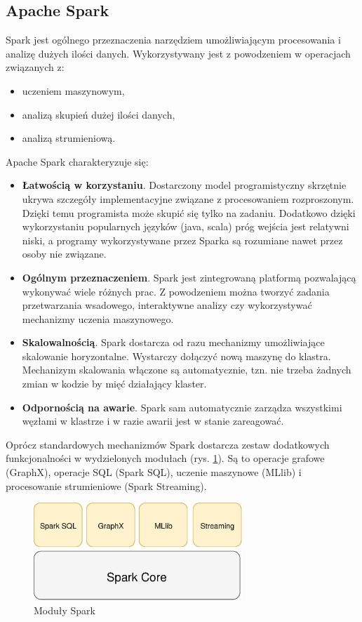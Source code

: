 \subsection{Apache Spark}
Spark jest ogólnego przeznaczenia narzędziem umożliwiającym procesowania
i analizę dużych ilości danych.
Wykorzystywany jest z powodzeniem w operacjach związanych z:
\begin{itemize}
  \item uczeniem maszynowym,
  \item analizą skupień dużej ilości danych,
  \item analizą strumieniową.
\end{itemize}
Apache Spark charakteryzuje się:
\begin{itemize}
  \item \textbf{Łatwością w korzystaniu}.
  Dostarczony model programistyczny skrzętnie ukrywa szczegóły implementacyjne związane z procesowaniem rozproszonym.
  Dzięki temu programista może skupić się tylko na zadaniu.
  Dodatkowo dzięki wykorzystaniu popularnych języków (java, scala) próg wejścia jest relatywni niski,
  a programy wykorzystywane przez Sparka są rozumiane nawet przez osoby nie związane.
  \item \textbf{Ogólnym przeznaczeniem}.
  Spark jest zintegrowaną platformą pozwalającą wykonywać wiele różnych prac.
  Z powodzeniem można tworzyć zadania przetwarzania wsadowego,
  interaktywne analizy czy wykorzystywać mechanizmy uczenia maszynowego.
  \item \textbf{Skalowalnością}.
  Spark dostarcza od razu mechanizmy umożliwiające skalowanie horyzontalne.
  Wystarczy dołączyć nową maszynę do klastra.
  Mechanizym skalowania włączone są automatycznie,
  tzn. nie trzeba żadnych zmian w kodzie by mięć działający klaster.
  \item \textbf{Odpornością na awarie}.
  Spark sam automatycznie zarządza wszystkimi węzłami w klastrze
  i w razie awarii jest w stanie zareagować.
\end{itemize}

Oprócz standardowych mechanizmów Spark dostarcza zestaw dodatkowych funkcjonalności
w wydzielonych modułach (rys. \ref{fig:SparkModules}).
Są to operacje grafowe (GraphX), operacje SQL (Spark SQL), uczenie maszynowe (MLlib)
i procesowanie strumieniowe (Spark Streaming).
\begin{figure}[htbp]
  \centering
  \includegraphics[width=0.7\textwidth]{img/sparkModules}
  \caption{Moduły Spark}
  \label{fig:SparkModules}
\end{figure}
